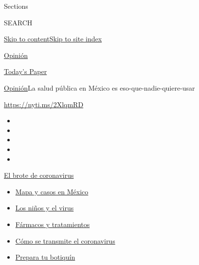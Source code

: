Sections

SEARCH

\protect\hyperlink{site-content}{Skip to
content}\protect\hyperlink{site-index}{Skip to site index}

\href{https://www.nytimes3xbfgragh.onion/es/section/opinion}{Opinión}

\href{https://myaccount.nytimes3xbfgragh.onion/auth/login?response_type=cookie\&client_id=vi}{}

\href{https://www.nytimes3xbfgragh.onion/section/todayspaper}{Today's
Paper}

\href{/es/section/opinion}{Opinión}\textbar{}La salud pública en México
es eso-que-nadie-quiere-usar

\url{https://nyti.ms/2XlqmRD}

\begin{itemize}
\item
\item
\item
\item
\item
\end{itemize}

\href{https://www.nytimes3xbfgragh.onion/es/spotlight/coronavirus?action=click\&pgtype=Article\&state=default\&region=TOP_BANNER\&context=storylines_menu}{El
brote de coronavirus}

\begin{itemize}
\tightlist
\item
  \href{https://www.nytimes3xbfgragh.onion/es/interactive/2020/espanol/america-latina/coronavirus-en-mexico.html?action=click\&pgtype=Article\&state=default\&region=TOP_BANNER\&context=storylines_menu}{Mapa
  y casos en México}
\item
  \href{https://www.nytimes3xbfgragh.onion/es/2020/07/31/espanol/ciencia-y-tecnologia/ninos-contagio-coronavirus.html?action=click\&pgtype=Article\&state=default\&region=TOP_BANNER\&context=storylines_menu}{Los
  niños y el virus}
\item
  \href{https://www.nytimes3xbfgragh.onion/es/interactive/2020/science/coronavirus-tratamientos-curas.html?action=click\&pgtype=Article\&state=default\&region=TOP_BANNER\&context=storylines_menu}{Fármacos
  y tratamientos}
\item
  \href{https://www.nytimes3xbfgragh.onion/es/2020/07/06/espanol/ciencia-y-tecnologia/coronavirus-transmision-aire.html?action=click\&pgtype=Article\&state=default\&region=TOP_BANNER\&context=storylines_menu}{Cómo
  se transmite el coronavirus}
\item
  \href{https://www.nytimes3xbfgragh.onion/es/2020/07/14/espanol/estilos-de-vida/botiquin-medicina-coronavirus.html?action=click\&pgtype=Article\&state=default\&region=TOP_BANNER\&context=storylines_menu}{Prepara
  tu botiquín}
\end{itemize}

